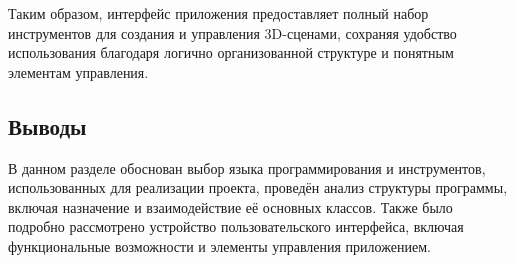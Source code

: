 Таким образом, интерфейс приложения предоставляет полный набор инструментов для создания и управления 3D-сценами, сохраняя удобство использования благодаря логично организованной структуре и понятным элементам управления.



\subsection{Выводы}

\hspace{1.25cm}
В данном разделе обоснован выбор языка программирования и инструментов, использованных для реализации проекта, проведён анализ структуры программы, включая назначение и взаимодействие её основных классов. Также было подробно рассмотрено устройство пользовательского интерфейса, включая функциональные возможности и элементы управления приложением.


\newpage